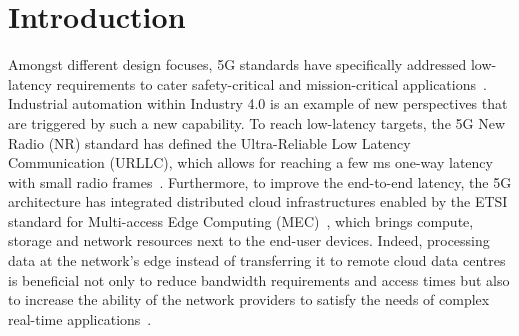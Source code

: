\section{Introduction}
\label{sec:introduction}
\noindent
Amongst different design focuses, 5G standards have specifically addressed low-latency requirements to  cater safety-critical and mission-critical applications~\cite{2020_comst_5G_latency}. Industrial automation within Industry 4.0 is an example of new perspectives that are triggered by such a new capability. To reach low-latency targets, the 5G New Radio (NR) standard has defined the Ultra-Reliable Low Latency Communication (URLLC), which allows for reaching a few ms one-way latency with small radio frames~\cite{2021_access_urllc}. Furthermore, to improve the end-to-end latency, the 5G architecture has integrated distributed cloud infrastructures enabled by the ETSI standard for Multi-access Edge Computing (MEC)~\cite{MEC003}, which brings compute, storage and network resources next to the end-user devices. Indeed, processing data at the network’s edge instead of transferring it to remote cloud data centres is beneficial not only to reduce bandwidth requirements and access times but also to increase the ability of the network providers to satisfy the needs of complex real-time applications~\cite{2018_comst_mec_iot,2021_jnca_edge}.  

